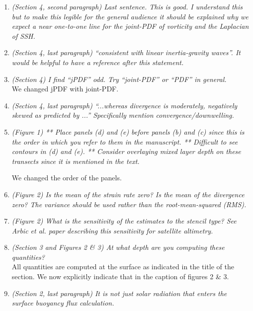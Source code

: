 \documentclass[11pt]{article}
\newcommand{\bdp}{\begin{description}}
\newcommand{\edp}{\end{description}}
\begin{document}
\begin{enumerate}
\item {\it (Section 4, second paragraph) Last sentence. This is good. I understand this but to
        make this legible for the general audience it should be explained why we expect a near
        one-to-one line for the joint-PDF of vorticity and the Laplacian of SSH.}

\item {\it (Section 4, last paragraph) ``consistent with linear inertia-gravity waves''.
        It would be
        helpful to have a reference after this statement.}

\item {\it (Section 4) I find “jPDF” odd. Try “joint-PDF” or “PDF” in general.}\\

We changed jPDF with joint-PDF.

\item {\it (Section 4, last paragraph) ``...whereas divergence is moderately, negatively skewed as
        predicted by ...'' Specifically mention convergence/downwelling.}

\item {\it (Figure 1) ** Place panels (d) and (e) before panels (b) and (c) since this is the order
        in which you refer to them in the manuscript. ** Difficult to see contours in (d) and
        (e). ** Consider overlaying mixed layer depth on these transects since it is mentioned
        in the text.}

        \bdp
          We changed the order of the panels.
        \edp

\item {\it (Figure 2) Is the mean of the strain rate zero? Is the mean of the divergence zero? The
        variance should be used rather than the root-mean-squared (RMS).}

\item {\it (Figure 2) What is the sensitivity of the estimates to the stencil type? See Arbic et al.
        paper describing this sensitivity for satellite altimetry.}

\item {\it (Section 3 and Figures 2 \& 3) At what depth are you computing these quantities?}\\

  All quantities are computed at the surface as indicated in the title of the
  section. We now explicitly indicate that in the caption of figures 2 \& 3.

\item {\it (Section 2, last paragraph) It is not just solar radiation that enters the surface buoyancy
      flux calculation.}


\end{enumerate}
\end{document}
